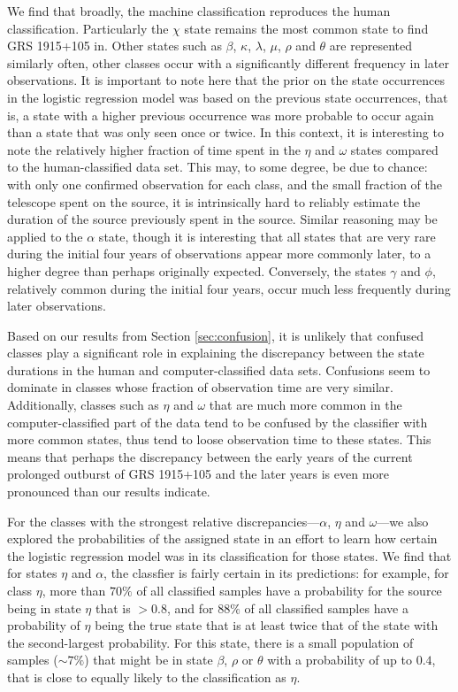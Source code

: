 \documentclass[12pt]{emulateapj}
\begin{document}
We find that broadly, the machine classification reproduces the human classification. Particularly the $\chi$ state remains the most common state to find GRS 1915+105 in. Other states such as $\beta$, $\kappa$, $\lambda$, $\mu$, $\rho$ and $\theta$ are represented similarly often, other classes occur with a significantly different frequency in later observations. It is important to note here that the prior on the state occurrences in the logistic regression model was based on the previous state occurrences, that is, a state with a higher previous occurrence was more probable to occur again than a state that was only seen once or twice. In this context, it is interesting to note the relatively higher fraction of time spent in the $\eta$ and $\omega$ states compared to the human-classified data set. 
This may, to some degree, be due to chance: with only one confirmed observation for each class, and the small fraction of the telescope spent on the source, it is intrinsically hard to reliably estimate the duration of the source previously spent in the source. Similar reasoning may be applied to the $\alpha$ state, though it is interesting that all states that are very rare during the initial four years of observations appear more commonly later, to a higher degree than perhaps originally expected. Conversely, the states $\gamma$ and $\phi$, relatively common during the initial four years, occur much less frequently during later observations.

Based on our results from Section \ref{sec:confusion}, it is unlikely that confused classes play a significant role in explaining the discrepancy between the state durations in the human and computer-classified data sets. Confusions seem to dominate in classes whose fraction of observation time are very similar. 
Additionally, classes such as $\eta$ and $\omega$ that are much more common in the computer-classified part of the data tend to be confused by the classifier with more common states, thus tend to loose observation time to these states. This means that perhaps the discrepancy between the early years of the current prolonged outburst of GRS 1915+105 and the later years is even more pronounced than our results indicate. 

For the classes with the strongest relative discrepancies---$\alpha$, $\eta$ and $\omega$---we also explored the probabilities of the assigned state in an 
effort to learn how certain the logistic regression model was in its classification for those states. We find that for states $\eta$ and $\alpha$, the classfier is 
fairly certain in its predictions: for example, for class $\eta$, more than $70\%$ of all classified samples have a probability for the source being in state $\eta$ that is 
$>0.8$, and for $88\%$ of all classified samples have a probability of $\eta$ being the true state that is at least twice that of the state with the second-largest 
probability. For this state, there is a small population of samples ($\sim 7\%$) that might be in state $\beta$, $\rho$ or $\theta$ with a probability of up to $0.4$, that is close to equally likely to the classification as $\eta$. 
\end{document}

